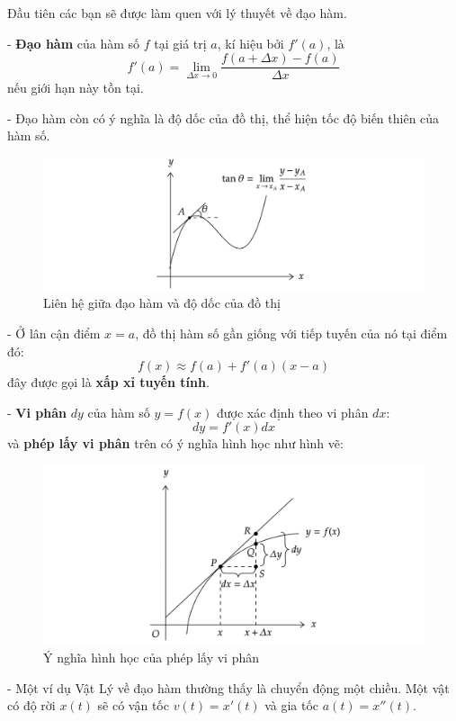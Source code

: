 Đầu tiên các bạn sẽ được làm quen với lý thuyết về đạo hàm.

- \textbf{Đạo hàm} của hàm số $f$ tại giá trị $a$, kí hiệu bởi $f'(a)$, là
    \begin{equation}
        f'(a)=\lim_{\Delta x\rightarrow 0}\frac{f(a+\Delta x)-f(a)}{\Delta x}
    \end{equation}
nếu giới hạn này tồn tại.

- Đạo hàm còn có ý nghĩa là độ dốc của đồ thị, thể hiện tốc độ biến thiên của hàm số.

\begin{figure}[h]
\centering
\includegraphics[width=1\textwidth]{Figures/tocdobienthien.png}
\caption{Liên hệ giữa đạo hàm và độ dốc của đồ thị}
\end{figure}
- Ở lân cận điểm $x=a$, đồ thị hàm số gần giống với tiếp tuyến của nó tại điểm đó:
\begin{equation}
        f(x)\approx f(a)+f'(a)(x-a)
    \end{equation}
đây được gọi là \textbf{xấp xỉ tuyến tính}.

- \textbf{Vi phân} $dy$ của hàm số $y=f(x)$ được xác định theo vi phân $dx$:
\begin{equation}
    dy=f'(x)dx
\end{equation}
và \textbf{phép lấy vi phân} trên có ý nghĩa hình học như hình vẽ:

\begin{figure}[h]
\centering
\includegraphics[width=1\textwidth]{Figures/viphan.png}
\caption{Ý nghĩa hình học của phép lấy vi phân}
\end{figure}

- Một ví dụ Vật Lý về đạo hàm thường thấy là chuyển động một chiều. Một vật có độ rời $x(t)$ sẽ có vận tốc $v(t)=x'(t)$ và gia tốc $a(t)=x''(t)$.